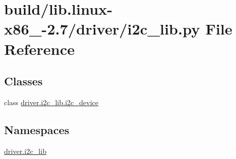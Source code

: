 \hypertarget{build_2lib_8linux-x86__64-2_87_2driver_2i2c__lib_8py}{}\section{build/lib.linux-\/x86\+\_-\/2.7/driver/i2c\+\_\+lib.py File Reference}
\label{build_2lib_8linux-x86__64-2_87_2driver_2i2c__lib_8py}
\subsection*{Classes}
\begin{DoxyCompactItemize}
\item 
class \hyperlink{classdriver_1_1i2c__lib_1_1i2c__device}{driver.\+i2c\+\_\+lib.\+i2c\+\_\+device}
\end{DoxyCompactItemize}
\subsection*{Namespaces}
\begin{DoxyCompactItemize}
\item 
 \hyperlink{namespacedriver_1_1i2c__lib}{driver.\+i2c\+\_\+lib}
\end{DoxyCompactItemize}
